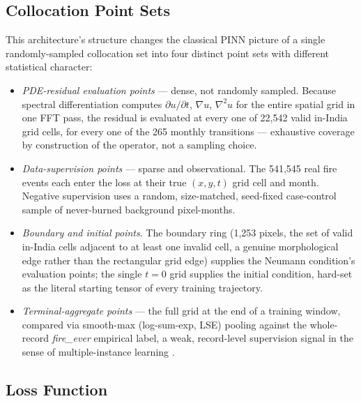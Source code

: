 \documentclass[journal]{IEEEtran}
\begin{document}
\subsection{Collocation Point Sets}

This architecture's structure changes the classical PINN picture of a single randomly-sampled collocation set into four distinct point sets with different statistical character:

\begin{itemize}
\item \emph{PDE-residual evaluation points} --- dense, not randomly sampled. Because spectral differentiation computes $\partial u/\partial t$, $\nabla u$, $\nabla^2 u$ for the entire spatial grid in one FFT pass, the residual is evaluated at every one of 22,542 valid in-India grid cells, for every one of the 265 monthly transitions --- exhaustive coverage by construction of the operator, not a sampling choice.
\item \emph{Data-supervision points} --- sparse and observational. The 541,545 real fire events each enter the loss at their true $(x,y,t)$ grid cell and month. Negative supervision uses a random, size-matched, seed-fixed case-control sample of never-burned background pixel-months.
\item \emph{Boundary and initial points}. The boundary ring (1,253 pixels, the set of valid in-India cells adjacent to at least one invalid cell, a genuine morphological edge rather than the rectangular grid edge) supplies the Neumann condition's evaluation points; the single $t=0$ grid supplies the initial condition, hard-set as the literal starting tensor of every training trajectory.
\item \emph{Terminal-aggregate points} --- the full grid at the end of a training window, compared via smooth-max (log-sum-exp, LSE) pooling against the whole-record \emph{fire\_ever} empirical label, a weak, record-level supervision signal in the sense of multiple-instance learning \cite{pinheiro2015}.
\end{itemize}

\subsection{Loss Function}
\end{document}
